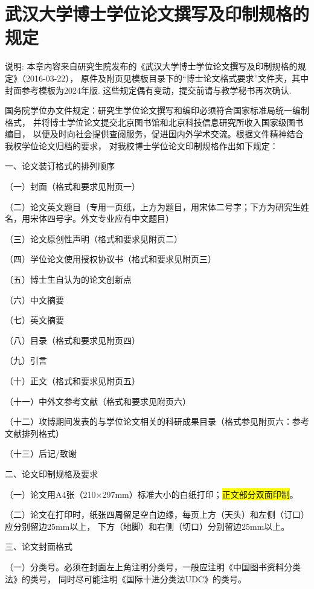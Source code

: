 \chapter{武汉大学博士学位论文撰写及印制规格的规定}


{ {\heiti 说明}: \kaishu
 本章内容来自研究生院发布的《武汉大学博士学位论文撰写及印制规格的规定》（2016-03-22），
 原件及附页见模板目录下的“博士论文格式要求”文件夹，其中封面参考模板为2024年版.
 这些规定偶有变动，提交前请与教学秘书再次确认.}

\bigskip

国务院学位办文件规定：研究生学位论文撰写和编印必须符合国家标准局统一编制格式，
并将博士学位论文提交北京图书馆和北京科技信息研究所收入国家级图书编目，
以便及时向社会提供查阅服务，促进国内外学术交流。根据文件精神结合我校学位论文归档的要求，
对我校博士学位论文印制规格作出如下规定：

{\heiti 一、论文装订格式的排列顺序}

（一）封面（格式和要求见附页一）

（二）论文英文题目（专用一页纸，上方为题目，用宋体二号字；下方为研究生姓名，用宋体四号字。外文专业应有中文题目）

（三）论文原创性声明（格式和要求见附页二）

（四）学位论文使用授权协议书（格式和要求见附页三）

（五）博士生自认为的论文创新点

（六）中文摘要

（七）英文摘要

（八）目录（格式和要求见附页四）

（九）引言

（十）正文（格式和要求见附页五）

（十一）中外文参考文献（格式和要求见附页六）

（十二）攻博期间发表的与学位论文相关的科研成果目录（格式参见附页六：参考文献排列格式）

（十三）后记/致谢

{\heiti 二、论文印制规格及要求}

（一）论文用A4张（210×297mm）标准大小的白纸打印；\colorbox{yellow}{正文部分双面印制}。

（二）论文在打印时，纸张四周留足空白边缘，每页上方（天头）和左侧（订口）应分别留边25mm以上，
下方（地脚）和右侧（切口）分别留边25mm以上。

{\heiti 三、论文封面格式}

（一）分类号。必须在封面左上角注明分类号，一般应注明《中国图书资料分类法》的类号，
同时尽可能注明《国际十进分类法UDC》的类号。

